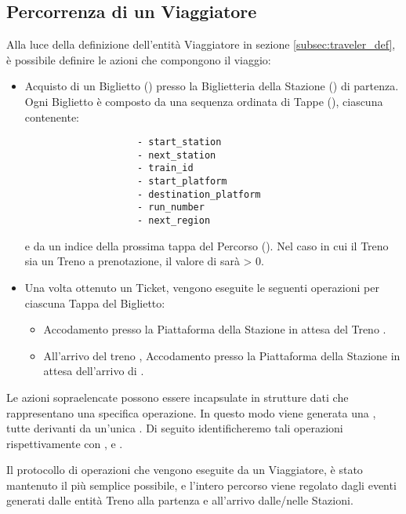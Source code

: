 \subsection{Percorrenza di un Viaggiatore}\label{subsec:percorrenza_viaggiatore}
	
	Alla luce della definizione dell'entità Viaggiatore in sezione \ref{subsec:traveler_def}, è possibile definire le azioni che compongono il viaggio:
		\begin{itemize}
			\item Acquisto di un Biglietto () presso la Biglietteria della Stazione () di partenza. Ogni Biglietto è composto da una sequenza ordinata di Tappe (), ciascuna contenente:
				\begin{verbatim}
					- start_station
					- next_station
					- train_id 
					- start_platform 
					- destination_platform
					- run_number
					- next_region
				\end{verbatim}
			e da un indice della prossima tappa del Percorso (). Nel caso in cui il Treno  sia un Treno a prenotazione, il valore di  sarà > 0.
			
			\item Una volta ottenuto un Ticket, vengono eseguite le seguenti operazioni per ciascuna Tappa del Biglietto:
				\begin{itemize}
					\item Accodamento presso la Piattaforma  della Stazione  in attesa del Treno .
					\item All'arrivo del treno , Accodamento presso la Piattaforma  della Stazione  in attesa dell'arrivo di . 
				\end{itemize}
		\end{itemize} 
	Le azioni sopraelencate possono essere incapsulate in strutture dati che rappresentano una specifica operazione. In questo modo viene generata una , tutte derivanti da un'unica . Di seguito identificheremo tali operazioni rispettivamente con ,  e .
	
	Il protocollo di operazioni che vengono eseguite da un Viaggiatore, è stato mantenuto il più semplice possibile, e l'intero percorso viene regolato dagli eventi generati dalle entità Treno alla partenza e all'arrivo dalle/nelle Stazioni. 
	
